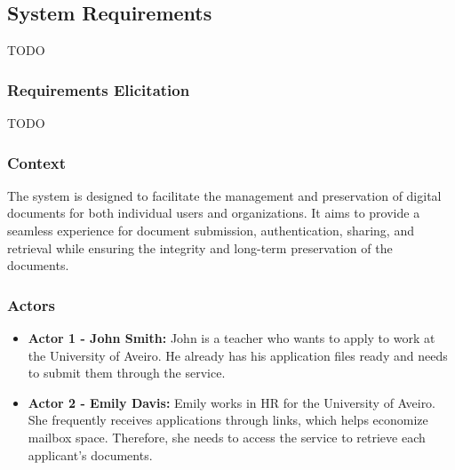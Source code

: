 \documentclass[a4paper,11pt]{article}
\begin{document}
    \subsection{System Requirements}
        TODO
    \subsubsection{Requirements Elicitation}
        TODO
        
    \subsubsection{Context}
        The system is designed to facilitate the management and preservation of digital documents for both individual users and organizations. It aims to provide a seamless experience for document submission, authentication, sharing, and retrieval while ensuring the integrity and long-term preservation of the documents.
        
    \subsubsection{Actors}
        \begin{itemize}
            \item \textbf{Actor 1 - John Smith:} John is a teacher who wants to apply to work at the University of Aveiro. He already has his application files ready and needs to submit them through the service.
            \item \textbf{Actor 2 - Emily Davis:} Emily works in HR for the University of Aveiro. She frequently receives applications through links, which helps economize mailbox space. Therefore, she needs to access the service to retrieve each applicant's documents.
        \end{itemize}
        
        
\end{document}
